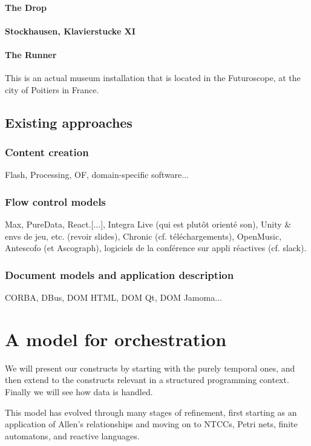 \documentclass{sigchi}
\begin{document}
\paragraph{The Drop}
\paragraph{Stockhausen, Klavierstucke XI}
\paragraph{The Runner}
This is an actual museum installation that is located in the Futuroscope, at the city of Poitiers in France.

\subsection{Existing approaches}

\subsubsection{Content creation}
Flash, Processing, OF, domain-specific software...

\subsubsection{Flow control models}
Max, PureData, React.[...], Integra Live (qui est plutôt orienté son), Unity \& envs de jeu, etc. (revoir slides), Chronic (cf. téléchargements), OpenMusic, Antescofo (et Ascograph), logiciels de la conférence sur appli réactives (cf. slack).

\subsubsection{Document models and application description} %
CORBA, DBus, DOM HTML, DOM Qt, DOM Jamoma...


\section{A model for orchestration}
We will present our constructs by starting with the purely temporal ones, 
and then extend to the constructs relevant in a structured programming context.
Finally we will see how data is handled.

This model has evolved through many stages of refinement, first starting as an application of 
Allen's relationships and moving on to NTCCs, Petri nets, finite automatons, and reactive languages.
\end{document}
